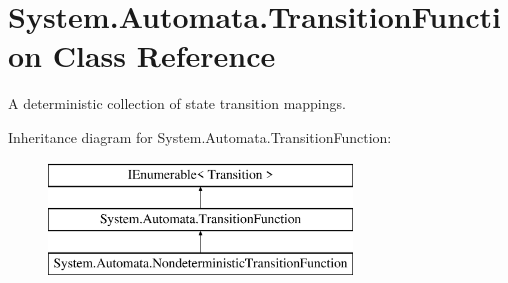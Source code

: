 \hypertarget{class_system_1_1_automata_1_1_transition_function}{}\section{System.\+Automata.\+Transition\+Function Class Reference}
\label{class_system_1_1_automata_1_1_transition_function}


A deterministic collection of state transition mappings.  


Inheritance diagram for System.\+Automata.\+Transition\+Function\+:\begin{figure}[H]
\begin{center}
\leavevmode
\includegraphics[height=3.000000cm]{class_system_1_1_automata_1_1_transition_function}
\end{center}
\end{figure}
